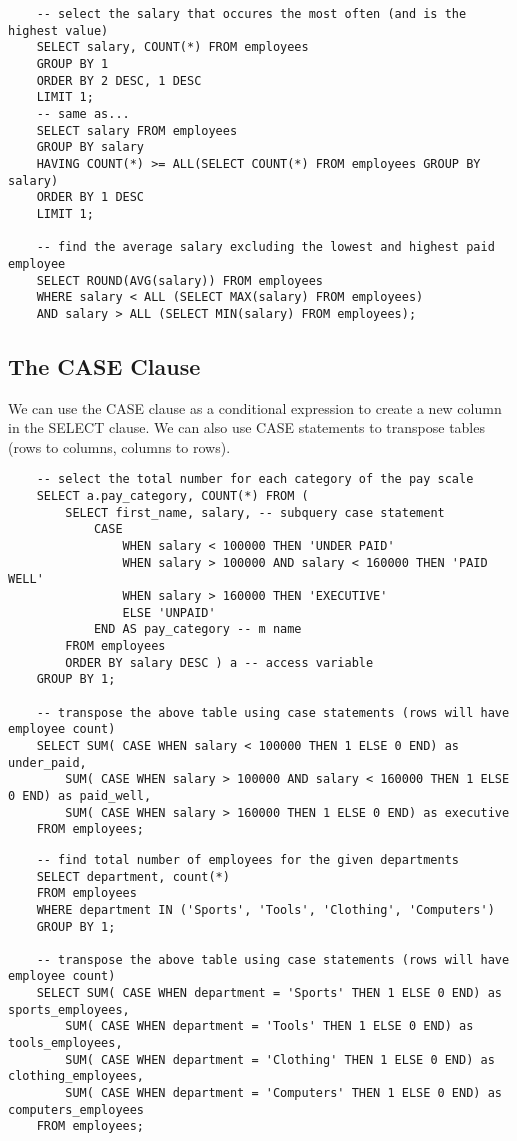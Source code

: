 \documentclass[11pt, a4paper]{article}
\begin{document}
\begin{spacing}{1.1}
\begin{lstlisting}
	-- select the salary that occures the most often (and is the highest value)
	SELECT salary, COUNT(*) FROM employees
	GROUP BY 1
	ORDER BY 2 DESC, 1 DESC
	LIMIT 1;
	-- same as...
	SELECT salary FROM employees
	GROUP BY salary
	HAVING COUNT(*) >= ALL(SELECT COUNT(*) FROM employees GROUP BY salary)
	ORDER BY 1 DESC
	LIMIT 1; 
	
	-- find the average salary excluding the lowest and highest paid employee
	SELECT ROUND(AVG(salary)) FROM employees
	WHERE salary < ALL (SELECT MAX(salary) FROM employees)
	AND salary > ALL (SELECT MIN(salary) FROM employees); \end{lstlisting} \vspace*{5mm}
	
	\subsection{The CASE Clause}
	We can use the CASE clause as a conditional expression to create a new column in the SELECT clause. We can also use CASE statements to transpose tables (rows to columns, columns to rows).
	\begin{lstlisting}
	-- select the total number for each category of the pay scale
	SELECT a.pay_category, COUNT(*) FROM (
		SELECT first_name, salary, -- subquery case statement
			CASE
				WHEN salary < 100000 THEN 'UNDER PAID'
				WHEN salary > 100000 AND salary < 160000 THEN 'PAID WELL'
				WHEN salary > 160000 THEN 'EXECUTIVE'
				ELSE 'UNPAID'
			END AS pay_category -- m name
		FROM employees 
		ORDER BY salary DESC ) a -- access variable
	GROUP BY 1; 
	
	-- transpose the above table using case statements (rows will have employee count)
	SELECT SUM( CASE WHEN salary < 100000 THEN 1 ELSE 0 END) as under_paid,
		SUM( CASE WHEN salary > 100000 AND salary < 160000 THEN 1 ELSE 0 END) as paid_well,
		SUM( CASE WHEN salary > 160000 THEN 1 ELSE 0 END) as executive
	FROM employees;	\end{lstlisting} \newpage
	\begin{lstlisting}
	-- find total number of employees for the given departments
	SELECT department, count(*)
	FROM employees 
	WHERE department IN ('Sports', 'Tools', 'Clothing', 'Computers')
	GROUP BY 1;
	
	-- transpose the above table using case statements (rows will have employee count)
	SELECT SUM( CASE WHEN department = 'Sports' THEN 1 ELSE 0 END) as sports_employees,
		SUM( CASE WHEN department = 'Tools' THEN 1 ELSE 0 END) as tools_employees,
		SUM( CASE WHEN department = 'Clothing' THEN 1 ELSE 0 END) as clothing_employees,
		SUM( CASE WHEN department = 'Computers' THEN 1 ELSE 0 END) as computers_employees
	FROM employees;
	

\end{lstlisting}
\end{spacing}
\end{document}
